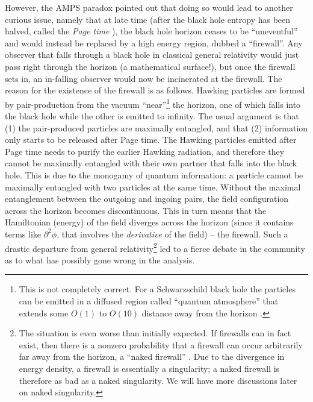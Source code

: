 \documentclass[preprintnumbers, floatfix, preprintnumbers, letterpaper, twocolumn, superscriptaddress,nofootinbib]{revtex4-2}
\begin{document}
However, the AMPS paradox pointed out that doing so would lead to another curious issue, namely that at late time (after the black hole entropy has been halved, called the \emph{Page time} \cite{9305007,9306083,1301.4995}), the black hole horizon ceases to be ``uneventful'' and would instead be replaced by a high energy region, dubbed a ``firewall''. Any observer that falls through a black hole in classical general relativity would just pass right through the horizon (a mathematical surface!), but once the firewall sets in, an in-falling observer would now be incinerated at the firewall. The reason for the existence of the firewall is as follows. Hawking particles are formed by pair-production from the vacuum ``near''\footnote{This is not completely correct. For a Schwarzschild black hole the particles can be emitted in a diffused region called ``quantum atmosphere'' that extends some $O(1)$ to $O(10)$ distance away from the horizon \cite{1511.08221}.} the horizon, one of which falls into the black hole while the other is emitted to infinity. The usual argument is that (1) the pair-produced particles are maximally entangled, and that (2) information only starts to be released after Page time. The Hawking particles emitted after Page time needs to purify the earlier Hawking radiation, and therefore they cannot be maximally entangled with their own partner that falls into the black hole. This is due to the monogamy of quantum information: a particle cannot be maximally entangled with two particles at the same time. Without the maximal entanglement between the outgoing and ingoing pairs, the field configuration across the horizon becomes discontinuous. This in turn means that the Hamiltonian (energy) of the field diverges across the horizon (since it contains terms like $\partial^2\phi$, that involves the \emph{derivative} of the field) -- the firewall. Such a drastic departure from general relativity\footnote{The situation is even worse than initially expected. If firewalls can in fact exist, then there is a nonzero probability that a firewall can occur arbitrarily far away from the horizon, a ``naked firewall'' \cite{1511.05695}. Due to the divergence in energy density, a firewall is essentially a singularity; a naked firewall is therefore as bad as a naked singularity. We will have more discussions later on naked singularity.} led to a fierce debate in the community as to what has possibly gone wrong in the analysis. 
\end{document}
